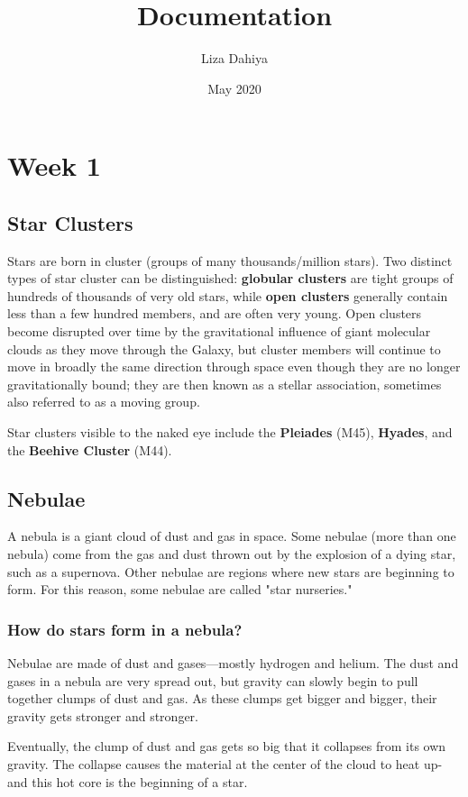 \documentclass{article}
\title{Documentation}
\author{Liza Dahiya}
\date{May 2020}
\begin{document}
\maketitle

\section{Week 1}
\subsection{Star Clusters}
Stars are born in cluster (groups of many thousands/million stars). Two distinct types of star cluster can be distinguished: \textbf{globular clusters} are tight groups of hundreds of thousands of very old stars, while \textbf{open clusters} generally contain less than a few hundred members, and are often very young. Open clusters become disrupted over time by the gravitational influence of giant molecular clouds as they move through the Galaxy, but cluster members will continue to move in broadly the same direction through space even though they are no longer gravitationally bound; they are then known as a stellar association, sometimes also referred to as a moving group. \par
Star clusters visible to the naked eye include the \textbf{Pleiades} (M45), \textbf{Hyades}, and the \textbf{Beehive Cluster} (M44).
\subsection{Nebulae}
A nebula is a giant cloud of dust and gas in space. Some nebulae (more than one nebula) come from the gas and dust thrown out by the explosion of a dying star, such as a supernova. Other nebulae are regions where new stars are beginning to form. For this reason, some nebulae are called "star nurseries."
\subsubsection{How do stars form in a nebula?}
Nebulae are made of dust and gases—mostly hydrogen and helium. The dust and gases in a nebula are very spread out, but gravity can slowly begin to pull together clumps of dust and gas. As these clumps get bigger and bigger, their gravity gets stronger and stronger.
\par
Eventually, the clump of dust and gas gets so big that it collapses from its own gravity. The collapse causes the material at the center of the cloud to heat up-and this hot core is the beginning of a star.
\end{document}
